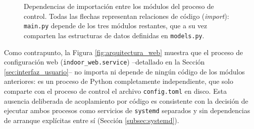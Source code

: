 \begin{figure}[H]
\caption[Dependencias de importación entre los módulos del proceso de control.]{Dependencias de importación entre los módulos del proceso de control. Todas las flechas representan relaciones de código (\textit{import}): \texttt{main.py} depende de los tres módulos restantes, que a su vez comparten las estructuras de datos definidas en \texttt{models.py}.}
\label{fig:arquitectura_control}
\end{figure}

Como contrapunto, la Figura \ref{fig:arquitectura_web} muestra que el proceso de configuración web (\texttt{indoor\_web.service}) --detallado en la Sección \ref{sec:interfaz_usuario}-- no importa ni depende de ningún código de los módulos anteriores: es un proceso de Python completamente independiente, que solo comparte con el proceso de control el archivo \texttt{config.toml} en disco. Esta ausencia deliberada de acoplamiento por código es consistente con la decisión de ejecutar ambos procesos como servicios de \texttt{systemd} separados y sin dependencias de arranque explícitas entre sí (Sección \ref{subsec:systemd}).

